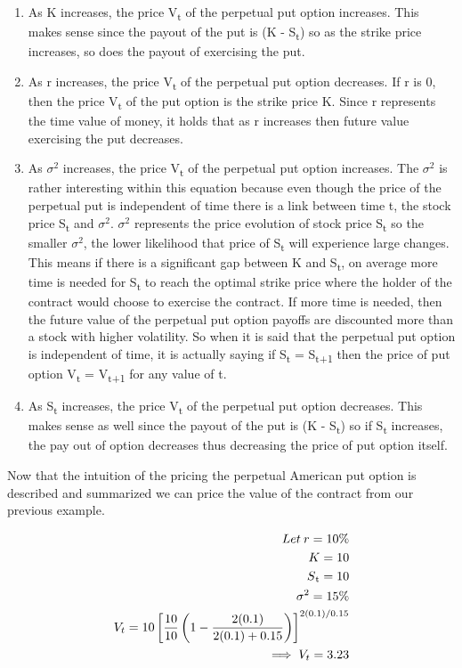 \documentclass{article}
\begin{document}
\begin{enumerate}
\item As K increases, the price V\textsubscript{t} of the perpetual put option increases. This makes sense since the payout of the put is (K - S\textsubscript{t}) so as the strike price increases, so does the payout of exercising the put\cite{amer_opts}.
\item As r increases, the price V\textsubscript{t} of the perpetual put option decreases. If r is 0, then the price V\textsubscript{t} of the put option is the strike price K. Since r represents the time value of money, it holds that as r increases then future value exercising the put decreases\cite{amer_opts}.
\item As $\sigma^2$ increases, the price V\textsubscript{t} of the perpetual put option increases. The $\sigma^2$ is rather interesting within this equation because even though the price of the perpetual put is independent of time there is a link between time t, the stock price S\textsubscript{t} and $\sigma^2$. $\sigma^2$ represents the price evolution of stock price S\textsubscript{t} so the smaller $\sigma^2$, the lower likelihood that price of S\textsubscript{t} will experience large changes. This means if there is a significant gap between K and S\textsubscript{t}, on average more time is needed for S\textsubscript{t} to reach the optimal strike price where the holder of the contract would choose to exercise the contract\cite{amer_opts}. If more time is needed, then the future value of the perpetual put option payoffs are discounted more than a stock with higher volatility\cite{amer_opts}. So when it is said that the perpetual put option is independent of time, it is actually saying if S\textsubscript{t} = S\textsubscript{t+1} then the price of put option V\textsubscript{t} = V\textsubscript{t+1} for any value of t.
\item As S\textsubscript{t} increases, the price V\textsubscript{t} of the perpetual put option decreases. This makes sense as well since the payout of the put is (K - S\textsubscript{t}) so if S\textsubscript{t} increases, the pay out of option decreases thus decreasing the price of put option itself.
\end{enumerate}

Now that the intuition of the pricing the perpetual American put option is described and summarized we can price the value of the contract from our previous example.

\begin{align*}
    Let \medspace r=10\% \\
    K = 10 \\
    S\textsubscript{t} = 10 \\
    \sigma^2 = 15\% \\
    V_{t} = 10 \left[ \frac{10}{10} \left( 1 - \frac{2(0.1)}{ 2(0.1)+0.15 } \right) \right] ^{2(0.1)/0.15 } \\
    \implies V_{t} = 3.23
\end{align*}
\end{document}
